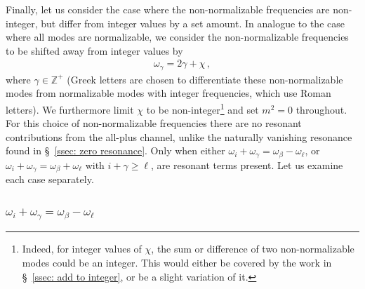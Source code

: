 \documentclass[letterpaper,11pt]{article}
\newcommand{\oi}{\omega_i}
\newcommand{\ol}{\omega_\ell}
\newcommand{\obet}{\omega_{\beta}}
\newcommand{\ogam}{\omega_\gamma}
\begin{document}
Finally, let us consider the case where the non-normalizable frequencies are non-integer, but differ from integer values by a set amount. In analogue to the case where all modes are normalizable, we consider the non-normalizable frequencies to be shifted away from integer values by
\begin{align}
\label{int plus chi}
\ogam = 2\gamma + \chi \, ,
\end{align}
where $\gamma \in \mathbb{Z}^+$ (Greek letters are chosen to differentiate these non-normalizable modes from normalizable modes with integer frequencies, which use Roman letters). We furthermore limit $\chi$ to be non-integer\footnote{Indeed, for integer values of $\chi$, the sum or difference of two non-normalizable modes could be an integer. This would either be covered by the work in \S\!~\ref{ssec: add to integer}, or be a slight variation of it.} and set $m^2 = 0$ throughout. For this choice of non-normalizable frequencies there are no resonant contributions from the all-plus channel, unlike the naturally vanishing resonance found in \S\!~\ref{ssec: zero resonance}. Only when either $\oi + \ogam = \obet - \ol$, or $\oi + \ogam = \obet + \ol$ with $i + \gamma \geq \ell$, are resonant terms present. Let us examine each case separately.

\subsubsection{$\oi + \ogam = \obet - \ol$}
\label{sssec: intpluschi1}
\end{document}

